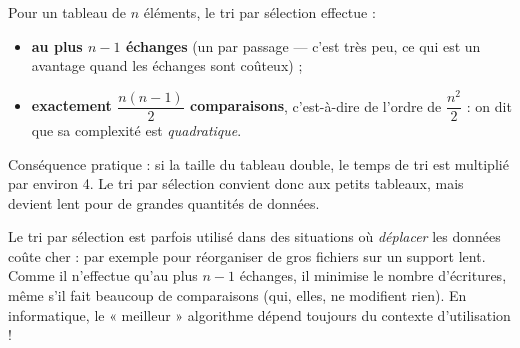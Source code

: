 \documentclass[11pt]{article}
\newcommand{\cle}[1]{{\popxbold\color{popdark}#1}}
\begin{document}
\begin{propriete}
Pour un tableau de $n$ éléments, le tri par sélection effectue :
\begin{itemize}
\item \textbf{au plus $n - 1$ échanges} (un par passage — c'est très peu, ce qui est un avantage quand les échanges sont coûteux) ;
\item \textbf{exactement $\dfrac{n(n-1)}{2}$ comparaisons}, c'est-à-dire de l'ordre de $\dfrac{n^2}{2}$ : on dit que sa \cle{complexité} est \emph{quadratique}.
\end{itemize}
Conséquence pratique : si la taille du tableau double, le temps de tri est multiplié par environ 4. Le tri par sélection convient donc aux petits tableaux, mais devient lent pour de grandes quantités de données.
\end{propriete}

\begin{savaistu}
Le tri par sélection est parfois utilisé dans des situations où \emph{déplacer} les données coûte cher : par exemple pour réorganiser de gros fichiers sur un support lent. Comme il n'effectue qu'au plus $n - 1$ échanges, il minimise le nombre d'écritures, même s'il fait beaucoup de comparaisons (qui, elles, ne modifient rien). En informatique, le « meilleur » algorithme dépend toujours du contexte d'utilisation !
\end{savaistu}
\end{document}
